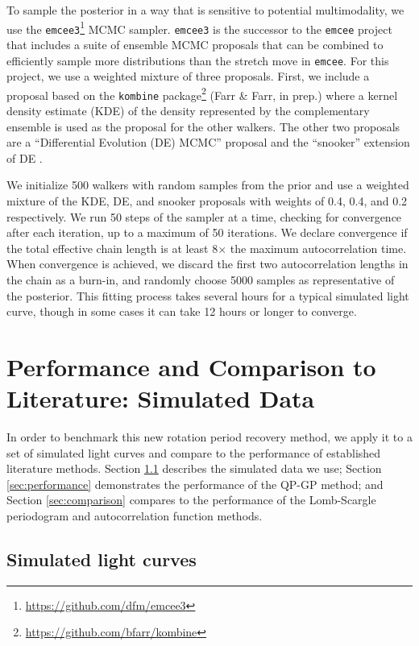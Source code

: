 \documentclass[useAMS, usenatbib, preprint, 12pt]{aastex}
\newcommand{\vrcomment}[1]{{\color{magenta}#1}}
\begin{document}
To sample the posterior in a way that is sensitive to potential multimodality,
we use the \texttt{emcee3}\footnote{\url{https://github.com/dfm/emcee3}} MCMC
sampler.
\texttt{emcee3} is the successor to the \texttt{emcee} project
\citep{Foreman-Mackey2013} that includes a suite of ensemble MCMC proposals
that can be combined to efficiently sample more distributions than the stretch
move \citep{Goodman2010} in \texttt{emcee}.
For this project, we use a weighted mixture of three proposals.
First, we include a proposal based on the \texttt{kombine}
package\footnote{\url{https://github.com/bfarr/kombine}} (Farr \& Farr, in
prep.) where a kernel density estimate (KDE) of the density represented by the
complementary ensemble is used as the proposal for the other walkers.
The other two proposals are a ``Differential Evolution (DE) MCMC'' proposal
\citep{terBraak2006, Nelson2014} and the ``snooker'' extension of DE
\citep{terBraak2008}.

We initialize 500 walkers with random samples from the prior and use a
weighted mixture of the KDE, DE, and snooker proposals with weights of 0.4,
0.4, and 0.2 respectively.
We run \vrcomment{50} steps of the sampler at a time, checking for convergence
after each iteration, up to a maximum of \vrcomment{50} iterations.
We declare convergence if the total effective chain length is at least
8$\times$ the maximum autocorrelation time.
When convergence is achieved, we discard the first two autocorrelation lengths
in the chain as a burn-in, and randomly choose 5000 samples as representative
of the posterior.
This fitting process takes several hours for a typical simulated light curve,
though in some cases it can take 12 hours or longer to converge.

\section{Performance and Comparison to Literature: Simulated Data}
\label{sec:perf_and_comp}

In order to benchmark this new rotation period recovery method, we apply
it to a set of simulated light curves
and compare to the performance of established literature methods.
Section \ref{sec:simulations} describes the simulated data we use;
Section \ref{sec:performance} demonstrates the performance of the
QP-GP method; and Section \ref{sec:comparison} compares to the performance
of the Lomb-Scargle periodogram and autocorrelation function methods.

\subsection{Simulated light curves}
\label{sec:simulations}
\end{document}

